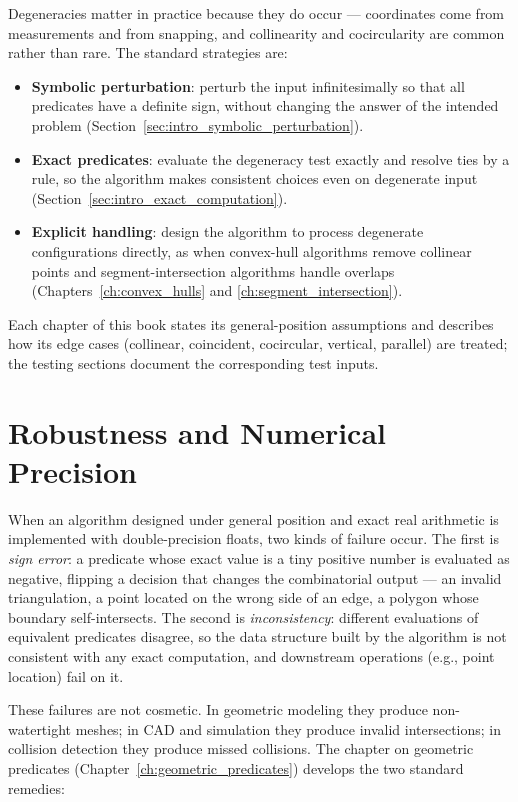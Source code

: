 Degeneracies matter in practice because they do occur --- coordinates come
from measurements and from snapping, and collinearity and cocircularity are
common rather than rare. The standard strategies are:
\begin{itemize}
  \item \textbf{Symbolic perturbation}: perturb the input infinitesimally
    so that all predicates have a definite sign, without changing the
    answer of the intended problem (Section~\ref{sec:intro_symbolic_perturbation}).
  \item \textbf{Exact predicates}: evaluate the degeneracy test exactly and
    resolve ties by a rule, so the algorithm makes consistent choices even
    on degenerate input (Section~\ref{sec:intro_exact_computation}).
  \item \textbf{Explicit handling}: design the algorithm to process
    degenerate configurations directly, as when convex-hull algorithms
    remove collinear points and segment-intersection algorithms handle
    overlaps (Chapters~\ref{ch:convex_hulls} and \ref{ch:segment_intersection}).
\end{itemize}

Each chapter of this book states its general-position assumptions and
describes how its edge cases (collinear, coincident, cocircular, vertical,
parallel) are treated; the testing sections document the corresponding
test inputs.


\section{Robustness and Numerical Precision}
\label{sec:intro_robustness}

When an algorithm designed under general position and exact real arithmetic
is implemented with double-precision floats, two kinds of failure occur.
The first is \emph{sign error}: a predicate whose exact value is a tiny
positive number is evaluated as negative, flipping a decision that changes
the combinatorial output --- an invalid triangulation, a point located on
the wrong side of an edge, a polygon whose boundary self-intersects. The
second is \emph{inconsistency}: different evaluations of equivalent
predicates disagree, so the data structure built by the algorithm is not
consistent with any exact computation, and downstream operations (e.g.,
point location) fail on it.

These failures are not cosmetic. In geometric modeling they produce
non-watertight meshes; in CAD and simulation they produce invalid
intersections; in collision detection they produce missed collisions. The
chapter on geometric predicates (Chapter~\ref{ch:geometric_predicates})
develops the two standard remedies:

